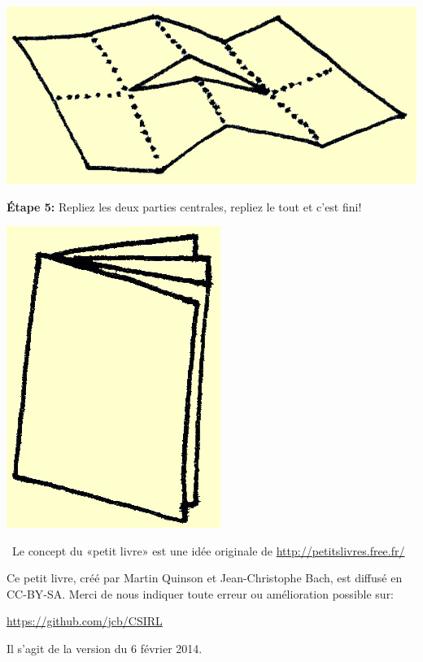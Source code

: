\documentclass[a4paper,12pt]{article}
\begin{document}
\begin{minipage}[b]{.45\linewidth}
\bigskip
\bigskip \centerline{\includegraphics{img/ptitlivre-etape3.jpg}}
  
\bigskip
\bigskip
\bigskip
\bigskip
\noindent\textbf{Étape 5:} Repliez les deux parties centrales, repliez
le tout et c'est fini!

  \centerline{\includegraphics{img/ptitlivre-etape5.jpg}}

\bigskip
\end{minipage}

\bigskip~\hfill{\small Le concept du «petit livre» est une idée
  originale de {\color{blue}\url{http://petitslivres.free.fr/}}}

\bigskip \bigskip \bigskip %
Ce petit livre, créé par Martin Quinson et Jean-Christophe Bach, est
diffusé en CC-BY-SA. Merci de nous indiquer toute erreur ou
amélioration possible sur:

\centerline{\color{blue}\url{https://github.com/jcb/CSIRL}}

\bigskip%
Il s'agit de la version du 6 février 2014.
\end{document}
